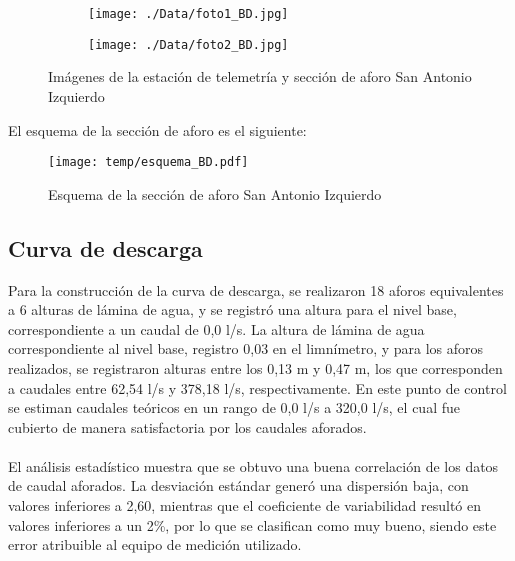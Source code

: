 \documentclass[]{article}
\begin{document}
\begin{figure}[H]
  \centering
\begin{subfigure}{.49\textwidth}
  \texttt{[image: ./Data/foto1\_BD.jpg]}
\end{subfigure}
\hfill
\begin{subfigure}{.49\textwidth}
  \texttt{[image: ./Data/foto2\_BD.jpg]}
\end{subfigure}
\caption{Imágenes de la estación de telemetría y sección de aforo San Antonio Izquierdo}
\label{fig:fotos_30}
\end{figure}

El esquema de la sección de aforo es el siguiente:

\begin{figure}[H]
  \centering
  \texttt{[image: temp/esquema\_BD.pdf]}
\caption{Esquema de la sección de aforo San Antonio Izquierdo}
\label{fig:Esquema_BD}
\end{figure}

\subsection{Curva de descarga}\label{curva-de-descarga-29}

Para la construcción de la curva de descarga, se realizaron 18 aforos equivalentes a 6 alturas de lámina de agua, y se registró una altura para el nivel base, correspondiente a un caudal de 0,0 l/s. La altura de lámina de agua correspondiente al nivel base, registro 0,03 en el limnímetro, y para los aforos realizados, se registraron alturas entre los 0,13 m y 0,47 m, los que corresponden a caudales entre 62,54 l/s y 378,18 l/s, respectivamente. En este punto de control se estiman caudales teóricos en un rango de 0,0 l/s a 320,0 l/s, el cual fue cubierto de manera satisfactoria por los caudales aforados.\\
\\
El análisis estadístico muestra que se obtuvo una buena correlación de los datos de caudal aforados. La desviación estándar generó una dispersión baja, con valores inferiores a 2,60, mientras que el coeficiente de variabilidad resultó en valores inferiores a un 2\%, por lo que se clasifican como muy bueno, siendo este error atribuible al equipo de medición utilizado.
\end{document}
